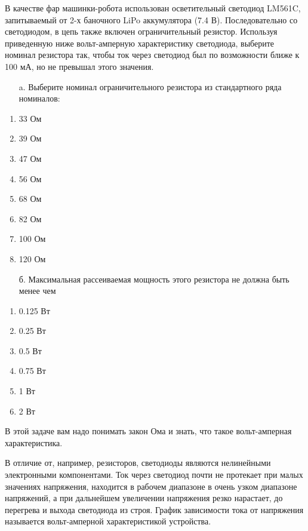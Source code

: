 
В качестве фар машинки-робота использован осветительный светодиод LM561C, запитываемый от 2-х баночного LiPo 
аккумулятора (7.4 В). Последовательно со светодиодом, в цепь также включен ограничительный резистор. 
Используя приведенную ниже вольт-амперную характеристику светодиода, выберите номинал резистора так, 
чтобы ток через светодиод был по возможности ближе к 100 мА, но не превышал этого значения.


\begin{enumerate}
    \item[a.] Выберите номинал ограничительного резистора из стандартного ряда номиналов:
\end{enumerate}    
\begin{enumerate}
    \item 33 Ом
    \item 39 Ом
    \item 47 Ом
    \item 56 Ом
    \item 68 Ом
    \item 82 Ом
    \item 100 Ом
    \item 120 Ом
\end{enumerate}

\begin{enumerate}
    \item[б.] Максимальная рассеиваемая мощность этого резистора не должна быть менее чем 
\end{enumerate}

\begin{enumerate}
    \item 0.125 Вт
    \item 0.25 Вт
    \item 0.5 Вт
    \item 0.75 Вт
    \item 1 Вт
    \item 2 Вт
\end{enumerate}

\solutionSection

В этой задаче вам надо понимать закон Ома и знать, что такое вольт-амперная характеристика.

В отличие от, например, резисторов, светодиоды являются нелинейными электронными компонентами. Ток через светодиод почти не протекает при малых значениях напряжения, находится в рабочем диапазоне в очень узком диапазоне напряжений, а при дальнейшем увеличении напряжения резко нарастает, до перегрева и выхода светодиода из строя. График зависимости тока от напряжения называется вольт-амперной характеристикой устройства.  

